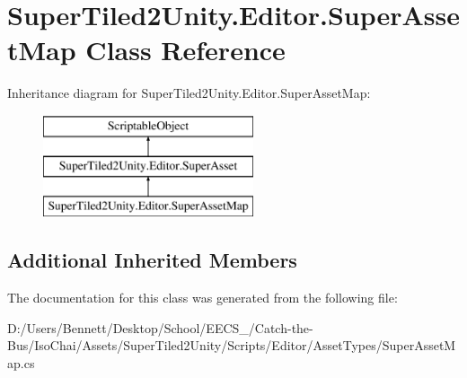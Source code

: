 \hypertarget{class_super_tiled2_unity_1_1_editor_1_1_super_asset_map}{}\section{Super\+Tiled2\+Unity.\+Editor.\+Super\+Asset\+Map Class Reference}
\label{class_super_tiled2_unity_1_1_editor_1_1_super_asset_map}
Inheritance diagram for Super\+Tiled2\+Unity.\+Editor.\+Super\+Asset\+Map\+:\begin{figure}[H]
\begin{center}
\leavevmode
\includegraphics[height=3.000000cm]{class_super_tiled2_unity_1_1_editor_1_1_super_asset_map}
\end{center}
\end{figure}
\subsection*{Additional Inherited Members}


The documentation for this class was generated from the following file\+:\begin{DoxyCompactItemize}
\item 
D\+:/\+Users/\+Bennett/\+Desktop/\+School/\+E\+E\+C\+S\+\_/\+Catch-\/the-\/\+Bus/\+Iso\+Chai/\+Assets/\+Super\+Tiled2\+Unity/\+Scripts/\+Editor/\+Asset\+Types/Super\+Asset\+Map.\+cs\end{DoxyCompactItemize}
